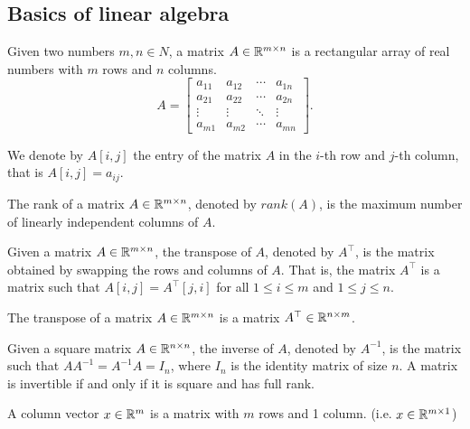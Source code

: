 \subsection{Basics of linear algebra}
\begin{definition}[Matrix]
    Given two numbers $m,n \in N$, a matrix $A \in \mathbb{R}^{m \times n}$ is a rectangular array of real numbers with $m$ rows and $n$ columns.
\begin{equation*}
    A = \begin{bmatrix}
    a_{11} & a_{12} & \cdots & a_{1n} \\
    a_{21} & a_{22} & \cdots & a_{2n} \\
    \vdots & \vdots & \ddots & \vdots \\
    a_{m1} & a_{m2} & \cdots & a_{mn}
    \end{bmatrix}.
\end{equation*}
\end{definition}
We denote by $A[i,j]$ the entry of the matrix $A$ in the $i$-th row and $j$-th column, that is $A[i,j] = a_{ij}$.
\begin{definition}
    The rank of a matrix $A \in \mathbb{R}^{m \times n}$, denoted by $rank(A)$, is the maximum number of linearly independent columns of $A$.
\end{definition}
\begin{definition}
    Given a matrix $A \in \mathbb{R}^{m \times n}$, the transpose of $A$, denoted by $A^\top$, is the matrix obtained by swapping the rows and columns of $A$.
    That is, the matrix $A^\top$ is a matrix such that $A[i,j] = A^\top[j,i]$ for all $1 \leq i \leq m$ and $1 \leq j \leq n$.
\end{definition}
\begin{observation}
    The transpose of a matrix $A \in \mathbb{R}^{m \times n}$ is a matrix $A^\top \in \mathbb{R}^{n \times m}$.
\end{observation}
\begin{definition}
    Given a square matrix $A \in \mathbb{R}^{n \times n}$, the inverse of $A$, denoted by $A^{-1}$, is the matrix such that $AA^{-1} = A^{-1}A = I_n$, where $I_n$ is the identity matrix of size $n$.
    A matrix is invertible if and only if it is square and has full rank.   
\end{definition}
\begin{definition}
    A column vector $x \in \mathbb{R}^m$ is a matrix with $m$ rows and 1 column. (i.e. $x \in \mathbb{R}^{m \times 1}$)
\end{definition}
